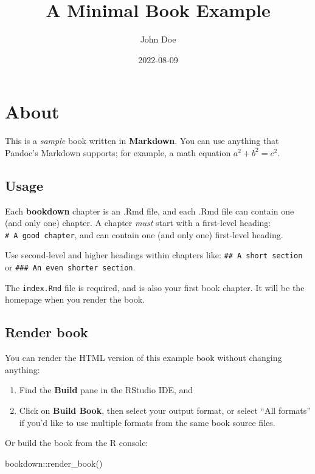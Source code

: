 \documentclass[
]{book}
\title{A Minimal Book Example}
\author{John Doe}
\date{2022-08-09}
\newenvironment{Shaded}{\begin{snugshade}}{\end{snugshade}}
\newcommand{\FunctionTok}[1]{\textcolor[rgb]{0.00,0.00,0.00}{#1}}
\newcommand{\NormalTok}[1]{#1}
\newcommand{\SpecialCharTok}[1]{\textcolor[rgb]{0.00,0.00,0.00}{#1}}
\begin{document}
\maketitle

{
\setcounter{tocdepth}{1}
\tableofcontents
}
\hypertarget{about}{%
\chapter{About}\label{about}}

This is a \emph{sample} book written in \textbf{Markdown}. You can use anything that Pandoc's Markdown supports; for example, a math equation \(a^2 + b^2 = c^2\).

\hypertarget{usage}{%
\section{Usage}\label{usage}}

Each \textbf{bookdown} chapter is an .Rmd file, and each .Rmd file can contain one (and only one) chapter. A chapter \emph{must} start with a first-level heading: \texttt{\#\ A\ good\ chapter}, and can contain one (and only one) first-level heading.

Use second-level and higher headings within chapters like: \texttt{\#\#\ A\ short\ section} or \texttt{\#\#\#\ An\ even\ shorter\ section}.

The \texttt{index.Rmd} file is required, and is also your first book chapter. It will be the homepage when you render the book.

\hypertarget{render-book}{%
\section{Render book}\label{render-book}}

You can render the HTML version of this example book without changing anything:

\begin{enumerate}
\def\labelenumi{\arabic{enumi}.}
\item
  Find the \textbf{Build} pane in the RStudio IDE, and
\item
  Click on \textbf{Build Book}, then select your output format, or select ``All formats'' if you'd like to use multiple formats from the same book source files.
\end{enumerate}

Or build the book from the R console:

\begin{Shaded}
\begin{Highlighting}[]
\NormalTok{bookdown}\SpecialCharTok{::}\FunctionTok{render\_book}\NormalTok{()}
\end{Highlighting}
\end{Shaded}
\end{document}

